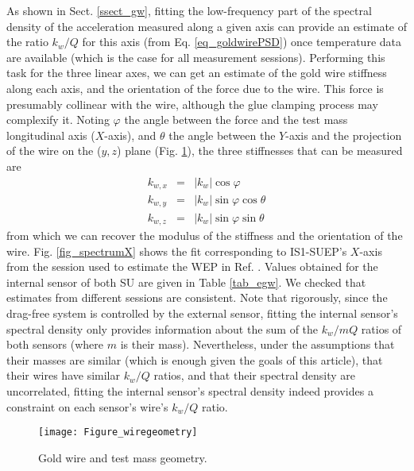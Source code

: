 \documentclass[12pt]{iopart}
\begin{document}
As shown in Sect. \ref{ssect_gw}, fitting the low-frequency part of the spectral density of the acceleration measured along a given axis can provide an estimate of the ratio $k_w/Q$ for this axis (from Eq. \ref{eq_goldwirePSD}) once temperature data are available (which is the case for all measurement sessions). %
Performing this task for the three linear axes, we can get an estimate of the gold wire stiffness along each axis, and the orientation of the force due to the wire. This force is presumably collinear with the wire, although the glue clamping process may complexify it. Noting $\varphi$ the angle between the force and the test mass longitudinal axis ($X$-axis), and $\theta$ the angle between the $Y$-axis and the projection of the wire on the ($y,z$) plane (Fig. \ref{fig_wiregeometry}), the three stiffnesses that can be measured are
\begin{eqnarray}
k_{w,x} & = & |k_w| \cos\varphi \\
k_{w,y} & = & |k_w| \sin\varphi \cos\theta \\
k_{w,z} & = & |k_w| \sin\varphi \sin\theta
\end{eqnarray}
from which we can recover the modulus of the stiffness and the orientation of the wire. Fig. \ref{fig_spectrumX} shows the fit corresponding to IS1-SUEP's $X$-axis from the session used to estimate the WEP in Ref. \cite{touboul17}. Values obtained for the internal sensor of both SU are given in Table \ref{tab_egw}. We checked that estimates from different sessions are consistent. 
Note that rigorously, since the drag-free system is controlled by the external sensor, fitting the internal sensor's spectral density only provides information about the sum of the $k_w/mQ$ ratios of both sensors (where $m$ is their mass). Nevertheless, under the assumptions that their masses are similar (which is enough given the goals of this article), that their wires have similar $k_w/Q$ ratios, and that their spectral density are uncorrelated, fitting the internal sensor's spectral density indeed provides a constraint on each sensor's wire's $k_w/Q$ ratio.



\begin{figure}%
\begin{center}
\texttt{[image: Figure\_wiregeometry]}
\caption{Gold wire and test mass geometry.}
\label{fig_wiregeometry}
\end{center}
\end{figure}
\end{document}
